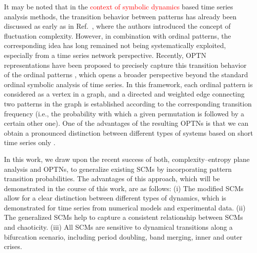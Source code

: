 \documentclass[aip,cha,reprint,nofootinbib]{revtex4-1}
\begin{document}
It may be noted that in the \textcolor{red}{context of symbolic dynamics} based time series analysis methods, the transition behavior between patterns {\color{red} has already been discussed as early as in Ref.~\cite{batesPLA1993}, where the authors introduced the concept of fluctuation complexity. However, in combination with ordinal patterns, the corresponding idea has long remained not being systematically exploited, especially from a time series network perspective.} Recently, OPTN representations have been proposed to precisely capture this transition behavior of the ordinal patterns \cite{MichaelChaos2015,KulpChaos2016,zhangSciRep2017,McCullough2017b,BorgesAMC2019}, which opens a broader perspective beyond the standard ordinal symbolic analysis of time series. In this framework, each ordinal pattern is considered as a vertex in a graph, and a directed and weighted edge connecting two patterns in the graph is established according to the corresponding transition frequency (i.e., the probability with which a given permutation is followed by a certain other one). One of the advantages of the resulting OPTNs is that we can obtain a pronounced distinction between different types of systems based on short time series only \cite{MichaelChaos2015,BorgesAMC2019}. 

In this work, we draw upon the recent success of both, complexity--entropy plane analysis and OPTNs, to generalize  existing SCMs by incorporating pattern transition probabilities. The advantages of this approach, which will be demonstrated in the course of this work, are as follows: (i) The modified SCMs allow for a clear distinction between different types of dynamics, which is demonstrated for time series from numerical models and experimental data. (ii) The generalized SCMs help to capture a consistent relationship between SCMs and chaoticity. (iii) All SCMs are sensitive to dynamical transitions along a bifurcation scenario, including period doubling, band merging, inner and outer crises. 
\end{document}
